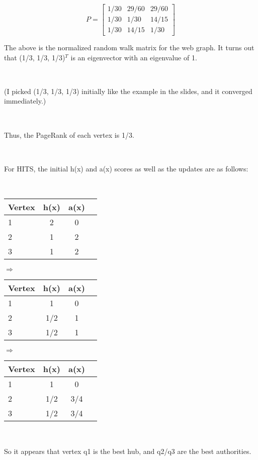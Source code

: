 \documentclass[12pt]{article}
\newcommand{\mt}[1]{\ensuremath{#1}}
\newcommand{\rar}{ \mt{\Rightarrow} }     %
\begin{document}
\begin{displaymath}
    P = \begin{bmatrix}
     1/30 & 29/60 & 29/60 \\
     1/30 & 1/30 & 14/15 \\
     1/30 & 14/15 & 1/30  
  \end{bmatrix}
\end{displaymath}

The above is the normalized random walk matrix for the web graph. It turns out that (1/3, 1/3, 1/3)$^T$ is an eigenvector with an eigenvalue of 1.

\

(I picked (1/3, 1/3, 1/3) initially like the example in the slides, and it converged immediately.)

\

 Thus, the PageRank of each vertex is 1/3.
 
 \
 
 For HITS, the initial h(x) and a(x) scores as well as the updates are as follows:
 
 \
 
\begin{tabular}{l|ccc}
  Vertex & h(x) & a(x) \\
  \hline
  1 & 2 & 0 \\
  2 & 1 & 2 \\
  3 & 1 & 2
\end{tabular} \rar 
\begin{tabular}{l|ccc}
  Vertex & h(x) & a(x) \\
  \hline
  1 & 1 & 0 \\
  2 & 1/2 & 1 \\
  3 & 1/2 & 1
\end{tabular} \rar
\begin{tabular}{l|ccc}
  Vertex & h(x) & a(x) \\
  \hline
  1 & 1 & 0 \\
  2 & 1/2 & 3/4 \\
  3 & 1/2 & 3/4
\end{tabular}

\

So it appears that vertex q1 is the best hub, and q2/q3 are the best authorities.
\end{document}
